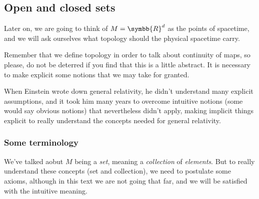 \subsection{Open and closed sets}
Later on, we are going to think of $M = \symbb{R}^d$ as the points of
spacetime, and we will ask ourselves what topology should the physical
spacetime carry.

Remember that we define topology in order to talk about continuity of maps, so
please, do not be deterred if you find that this is a little abstract. It is
necessary to make explicit some notions that we may take for granted.

When Einstein wrote down general relativity, he didn't understand many explicit
assumptions, and it took him many years to overcome intuitive notions
(some would say obvious notions) that nevertheless didn't apply, making
implicit things explicit to really understand the concepts needed for general
relativity.

\subsubsection{Some terminology}
We've talked aobut $M$ being a \emph{set}, meaning a \emph{collection} of
\emph{elements}. But to really understand these concepts (set and collection),
we need to postulate some axioms, although in this text we are not going that
far, and we will be satisfied with the intuitive meaning.

